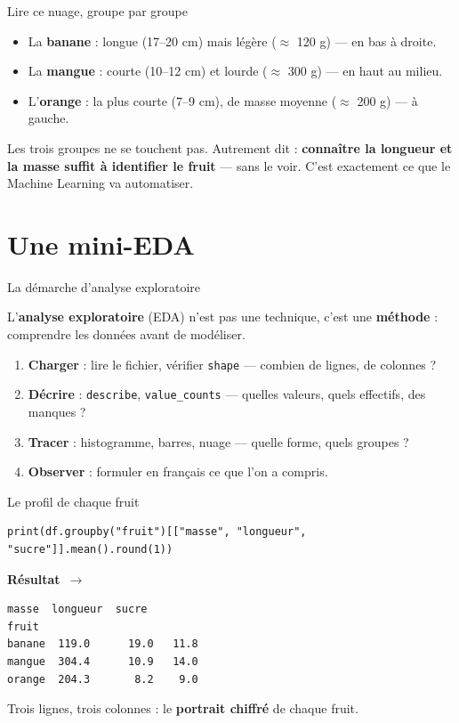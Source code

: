 \documentclass[aspectratio=169,11pt]{beamer}
\newcommand{\resultat}{{\scriptsize\textbf{R\'esultat}~$\rightarrow$}\par\vspace{1pt}}
\begin{document}
\begin{frame}{Lire ce nuage, groupe par groupe}
\begin{itemize}\small
  \item La \textbf{banane} : longue (17--20 cm) mais légère ($\approx$ 120 g) — en bas à droite.
  \item La \textbf{mangue} : courte (10--12 cm) et lourde ($\approx$ 300 g) — en haut au milieu.
  \item L'\textbf{orange} : la plus courte (7--9 cm), de masse moyenne ($\approx$ 200 g) — à gauche.
\end{itemize}
\begin{ucadret}
{\small Les trois groupes ne se touchent pas. Autrement dit : \textbf{connaître la longueur et la masse suffit à identifier le fruit} — sans le voir. C'est exactement ce que le Machine Learning va automatiser.}
\end{ucadret}
\end{frame}

\section{Une mini-EDA}

\begin{frame}{La démarche d'analyse exploratoire}
\begin{ucaddef}
{\small L'\textbf{analyse exploratoire} (EDA) n'est pas une technique, c'est une \textbf{méthode} : comprendre les données avant de modéliser.}
\end{ucaddef}
\begin{enumerate}\small
  \item \textbf{Charger} : lire le fichier, vérifier \texttt{shape} — combien de lignes, de colonnes ?
  \item \textbf{Décrire} : \texttt{describe}, \texttt{value\_counts} — quelles valeurs, quels effectifs, des manques ?
  \item \textbf{Tracer} : histogramme, barres, nuage — quelle forme, quels groupes ?
  \item \textbf{Observer} : formuler en français ce que l'on a compris.
\end{enumerate}
\end{frame}

\begin{frame}[fragile]{Le profil de chaque fruit}
\begin{lstlisting}
print(df.groupby("fruit")[["masse", "longueur", "sucre"]].mean().round(1))
\end{lstlisting}
\resultat
\begin{lstlisting}[style=out]
        masse  longueur  sucre
fruit
banane  119.0      19.0   11.8
mangue  304.4      10.9   14.0
orange  204.3       8.2    9.0
\end{lstlisting}
{\small Trois lignes, trois colonnes : le \textbf{portrait chiffré} de chaque fruit.}
\end{frame}
\end{document}
